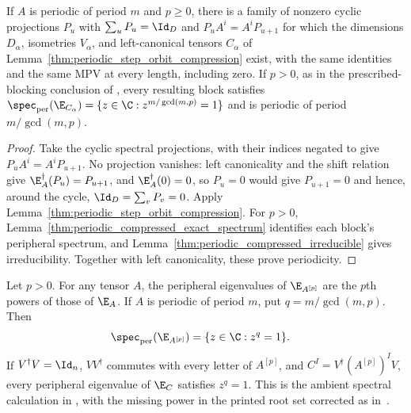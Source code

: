 \begin{lemma}
    \label{thm:periodic_prescribed_blocking_compression}
    \leanok
    If $A$ is periodic of period $m$ and $p\ge0$, there is a family of nonzero
    cyclic projections $P_u$ with $\sum_uP_u=\Id_D$ and
    $P_uA^i=A^iP_{u+1}$ for which the dimensions $D_\alpha$, isometries
    $V_\alpha$, and left-canonical tensors $C_\alpha$ of
    Lemma~\ref{thm:periodic_step_orbit_compression} exist, with the same
    identities and the same MPV at every length, including zero. If $p>0$,
    as in the prescribed-blocking conclusion of
    \cite[Lemma~6]{DeLasCuevas2017Irreducible}, every resulting block satisfies
    $\spec_{\mathrm{per}}(\E_{C_\alpha})=\{z\in\C:z^{m/\gcd(m,p)}=1\}$
    and is periodic of period $m/\gcd(m,p)$.
\end{lemma}

\begin{proof}\leanok
    Take the cyclic spectral projections, with their indices negated to give
    $P_uA^i=A^iP_{u+1}$. No projection vanishes: left canonicality and the
    shift relation give $\E_A^\dagger(P_u)=P_{u+1}$, and $\E_A^\dagger(0)=0$, so
    $P_u=0$ would give $P_{u+1}=0$ and hence, around the cycle,
    $\Id_D=\sum_vP_v=0$. Apply Lemma~\ref{thm:periodic_step_orbit_compression}.
    For $p>0$, Lemma~\ref{thm:periodic_compressed_exact_spectrum} identifies
    each block's peripheral spectrum, and
    Lemma~\ref{thm:periodic_compressed_irreducible} gives irreducibility.
    Together with left canonicality, these prove periodicity.
\end{proof}

\begin{lemma}
    \label{thm:periodic_blocking_peripheral_roots}
    \leanok
    Let $p>0$. For any tensor $A$, the peripheral eigenvalues of
    $\E_{A^{[p]}}$ are the $p$th powers of those of $\E_A$.
    If $A$ is periodic of period $m$, put $q=m/\gcd(m,p)$. Then
    \begin{align}
        \spec_{\mathrm{per}}(\E_{A^{[p]}})
         & =\{z\in\C:z^q=1\}.
        \label{eq:periodic_blocking_roots}
    \end{align}
    If $V^\dagger V=\Id_n$, $VV^\dagger$ commutes with every
    letter of $A^{[p]}$, and $C^I=V^\dagger(A^{[p]})^IV$, every peripheral
    eigenvalue of $\E_C$ satisfies $z^q=1$.
    This is the ambient spectral calculation in
    \cite[Lemma~6]{DeLasCuevas2017Irreducible}, with the missing power in
    the printed root set corrected as in~\cite{gap:dccsp17_blocking_peripheral_roots}.
\end{lemma}

